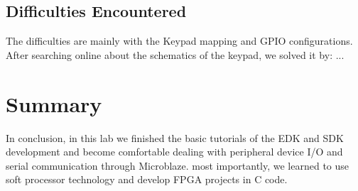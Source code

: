 \documentclass{article}
\begin{document}
\subsection{Difficulties Encountered}
The difficulties are mainly with the Keypad mapping and GPIO configurations. After searching online about the schematics of the keypad, we solved it by: ... 

\section{Summary}
In conclusion, in this lab we finished the basic tutorials of the EDK and SDK development and become comfortable dealing with peripheral device I/O and serial communication through Microblaze. most importantly, we learned to use soft processor technology and develop FPGA projects in C code. 
\end{document}
